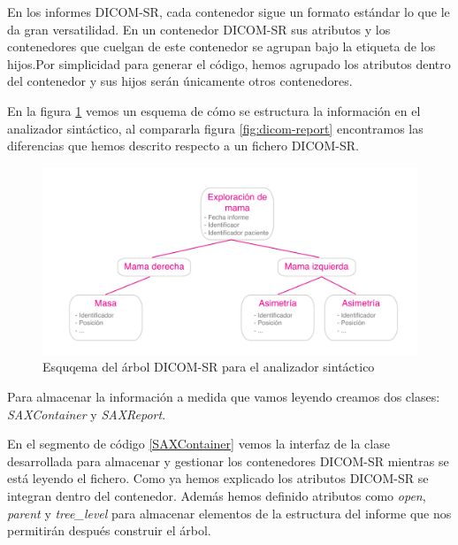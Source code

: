 En los informes DICOM-SR, cada contenedor sigue un formato estándar lo que le da gran versatilidad. En un contenedor DICOM-SR sus atributos y los contenedores que cuelgan de este contenedor se agrupan bajo la etiqueta de los hijos.Por simplicidad para generar el código, hemos agrupado los atributos dentro del contenedor y sus hijos serán únicamente otros contenedores.\par
En la figura \ref{fig:SAXReport_schema} vemos un esquema de cómo se estructura la información en el analizador sintáctico, al compararla figura \ref{fig:dicom-report} encontramos las diferencias que hemos descrito respecto a un fichero DICOM-SR.\par

\begin{figure}[ht]
\centering
\includegraphics[scale=0.7]{./imgs/esquemas/dicomsrTreeSAX.pdf}
\caption{Esquqema del árbol DICOM-SR para el analizador sintáctico}
\label{fig:SAXReport_schema}
\end{figure}


Para almacenar la información a medida que vamos leyendo creamos dos clases: \emph{SAXContainer} y \emph{SAXReport}.\par
En el segmento de código \ref{SAXContainer} vemos la interfaz de la clase desarrollada para almacenar y gestionar los contenedores DICOM-SR mientras se está leyendo el fichero. Como ya hemos explicado los atributos DICOM-SR se integran dentro del contenedor. Además hemos definido atributos como \emph{open}, \emph{parent} y \emph{tree\_level} para almacenar elementos de la estructura del informe que nos permitirán después construir el árbol.\par

